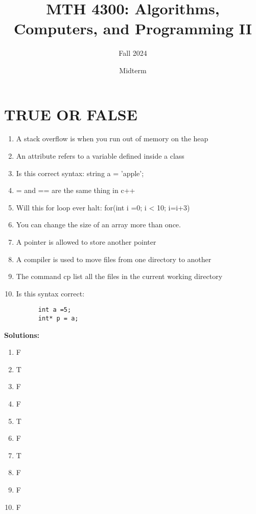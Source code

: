 \documentclass[a4paper]{article}
\title{MTH 4300: Algorithms, Computers, and Programming II}
\author{Fall 2024}
\date{Midterm}
\begin{document}
\maketitle


\section{TRUE OR FALSE}
\begin{enumerate}
    \item A stack overflow is when you run out of memory on the heap
    \item An attribute refers to a variable defined inside a class
    \item Is this correct syntax: string a = 'apple';
    \item = and == are the same thing in c++
    \item Will this for loop ever halt: for(int i =0; i < 10; i=i+3)
    \item You can change the size of an array more than once.
    \item A pointer is allowed to store another pointer
    \item A compiler is used to move files from one directory to another
    \item The command cp list all the files in the current working directory
    \item Is this syntax correct:
    \begin{verbatim}
      int a =5;
      int* p = a;  
    \end{verbatim}    
\end{enumerate}

\textbf{Solutions:}
\begin{enumerate}
      \item F
      \item T
      \item F
      \item F
      \item T
      \item F
      \item T
      \item F
      \item F
      \item F
\end{enumerate}
\newpage
\end{document}
